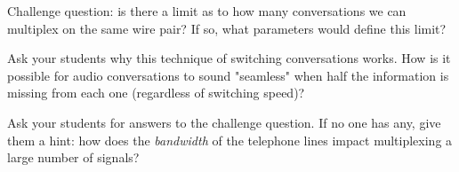 \vskip 10pt

Challenge question: is there a limit as to how many conversations we can multiplex on the same wire pair?  If so, what parameters would define this limit?







Ask your students why this technique of switching conversations works.  How is it possible for audio conversations to sound "seamless" when half the information is missing from each one (regardless of switching speed)?

Ask your students for answers to the challenge question.  If no one has any, give them a hint: how does the {\it bandwidth} of the telephone lines impact multiplexing a large number of signals?




